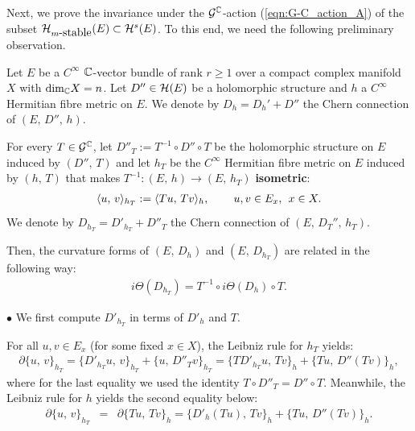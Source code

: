 \documentclass[12pt]{article}
\begin{document}
  
Next, we prove the invariance  under the ${\cal G}^{\mathbb{C}}$-action (\ref{eqn:G-C_action_A}) of the subset ${\cal H}_{m\mbox{-stable}}(E)\subset{\cal H}^s(E)$. To this end, we need the following preliminary observation.

\begin{Lem}\label{Lem:gauge-transf_curvature} Let $E$ be a $C^\infty$ $\mathbb{C}$-vector bundle of rank $r\geq 1$ over a compact complex manifold $X$ with $\mbox{dim}_{\mathbb{C}} X = n$. Let $D''\in{\cal H}(E)$ be a holomorphic structure and $h$ a $C^\infty$ Hermitian fibre metric on $E$. We denote by $D_h=D_h' + D''$ the Chern connection of $(E,\,D'',\,h)$.

  For every $T\in{\cal G}^{\mathbb{C}}$, let $D''_T:=T^{-1}\circ D''\circ T$ be the holomorphic structure on $E$ induced by $(D'',\,T)$ and let $h_T$ be the $C^\infty$ Hermitian fibre metric on $E$ induced by $(h,\,T)$ that makes $T^{-1}:(E,\,h)\longrightarrow(E,\,h_T)$ {\bf isometric}: \begin{eqnarray*}\langle u,\,v\rangle_{h_T}:= \langle Tu,\,Tv\rangle_h, \hspace{5ex} u,v\in E_x,\hspace{1ex} x\in X.\end{eqnarray*} We denote by $D_{h_T}= D'_{h_T} + D''_T$ the Chern connection of $(E,\,D_T'',\,h_T)$.

  Then, the curvature forms of $(E,\, D_h)$ and $(E,\,D_{h_T})$ are related in the following way: \begin{eqnarray}\label{eqn:gauge-transf_curvature}i\Theta(D_{h_T}) = T^{-1}\circ i\Theta(D_h)\circ T.\end{eqnarray}

\end{Lem}  

   $\bullet$ We first compute $D'_{h_T}$ in terms of $D'_h$ and $T$.

  For all $u,v\in E_x$ (for some fixed $x\in X$), the Leibniz rule for $h_T$ yields: \begin{eqnarray}\label{eqn:del-Leibniz_proof-curvatures_1}\partial\{u,\,v\}_{h_T} = \bigg\{D'_{h_T}u,\,v\bigg\}_{h_T} + \bigg\{u,\,D''_Tv\bigg\}_{h_T} = \bigg\{TD'_{h_T}u,\,Tv\bigg\}_h + \bigg\{Tu,\,D''(Tv)\bigg\}_h,\end{eqnarray} where for the last equality we used the identity $T\circ D''_T = D''\circ T$. Meanwhile, the Leibniz rule for $h$ yields the second equality below: \begin{eqnarray}\label{eqn:del-Leibniz_proof-curvatures_2}\partial\{u,\,v\}_{h_T}  & = & \partial\{Tu,\,Tv\}_h = \bigg\{D'_h(Tu),\,Tv\bigg\}_h + \bigg\{Tu,\,D''(Tv)\bigg\}_h.\end{eqnarray}
\end{document}
